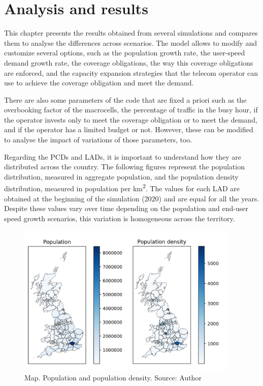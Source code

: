 \chapter{Analysis and results}
This chapter presents the results obtained from several simulations and compares them to analyse the differences across scenarios. The model allows to modify and customize several options, such as the population growth rate, the user-speed demand growth rate, the coverage obligations, the way this coverage obligations are enforced, and the capacity expansion strategies that the telecom operator can use to achieve the coverage obligation and meet the demand.\par

There are also some parameters of the code that are fixed a priori such as the overbooking factor of the macrocells, the percentage of traffic in the busy hour, if the operator invests only to meet the coverage obligation or to meet the demand, and if the operator has a limited budget or not. However, these can be modified to analyse the impact of variations of those parameters, too.\par

Regarding the PCDs and LADs, it is important to understand how they are distributed across the country. The following figures represent the population distribution, measured in aggregate population, and the population density distribution, measured in population per km\textsuperscript{2}. The values for each LAD are obtained at the beginning of the simulation (2020) and are equal for all the years. Despite these values vary over time depending on the population and end-user speed growth scenarios, this variation is homogeneous across the territory.\par




\begin{figure}[H]
	\begin{Center}
		\includegraphics[width=0.95\textwidth]{./media/image40.png}
		\caption{Map. Population and population density. Source: Author}
	\end{Center}
\end{figure}


